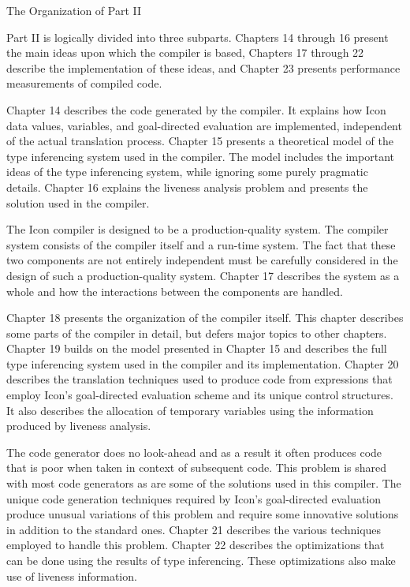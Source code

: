 {\sffamily
The Organization of Part II}


Part II is logically divided into three subparts. Chapters 14 through
16 present the main ideas upon which the compiler is based, Chapters
17 through 22 describe the implementation of these ideas, and Chapter
23 presents performance measurements of compiled code.

Chapter 14 describes the code generated by the compiler. It explains
how Icon data values, variables, and goal-directed evaluation are
implemented, independent of the actual translation process. Chapter 15
presents a theoretical model of the type inferencing system used in
the compiler. The model includes the important ideas of the type
inferencing system, while ignoring some purely pragmatic
details. Chapter 16 explains the liveness analysis problem and
presents the solution used in the compiler.

The Icon compiler is designed to be a production-quality system. The
compiler system consists of the compiler itself and a run-time
system. The fact that these two components are not entirely
independent must be carefully considered in the design of such a
production-quality system. Chapter 17 describes the system as a whole
and how the interactions between the components are handled.

Chapter 18 presents the organization of the compiler itself. This
chapter describes some parts of the compiler in detail, but defers
major topics to other chapters. Chapter 19 builds on the model
presented in Chapter 15 and describes the full type inferencing system
used in the compiler and its implementation. Chapter 20 describes the
translation techniques used to produce code from expressions that
employ Icon's goal-directed evaluation scheme and its unique control
structures. It also describes the allocation of temporary variables
using the information produced by liveness analysis.

The code generator does no look-ahead and as a result it often
produces code that is poor when taken in context of subsequent
code. This problem is shared with most code generators as are some of
the solutions used in this compiler.  The unique code generation
techniques required by Icon's goal-directed evaluation produce unusual
variations of this problem and require some innovative solutions in
addition to the standard ones. Chapter 21 describes the various
techniques employed to handle this problem. Chapter 22 describes the
optimizations that can be done using the results of type
inferencing. These optimizations also make use of liveness
information.

